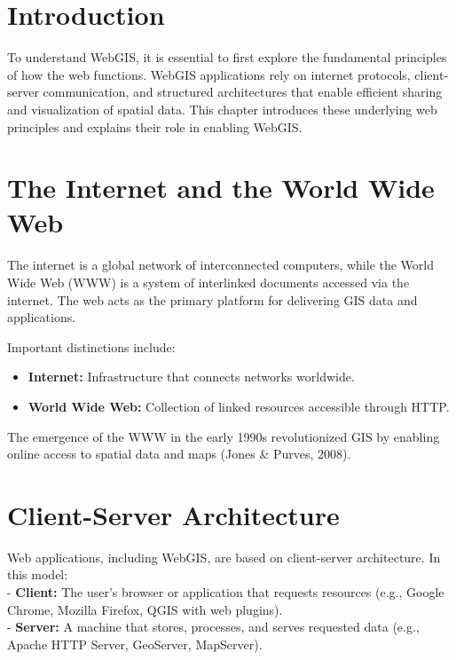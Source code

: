 \documentclass[
  11pt,
  letterpaper,
]{book}
\providecommand{\tightlist}{%
  \setlength{\itemsep}{0pt}\setlength{\parskip}{0pt}}
\begin{document}
\section{Introduction}\label{introduction-2}

To understand WebGIS, it is essential to first explore the fundamental
principles of how the web functions. WebGIS applications rely on
internet protocols, client-server communication, and structured
architectures that enable efficient sharing and visualization of spatial
data. This chapter introduces these underlying web principles and
explains their role in enabling WebGIS.

\section{The Internet and the World Wide
Web}\label{the-internet-and-the-world-wide-web}

The internet is a global network of interconnected computers, while the
World Wide Web (WWW) is a system of interlinked documents accessed via
the internet. The web acts as the primary platform for delivering GIS
data and applications.

Important distinctions include:

\begin{itemize}
\tightlist
\item
  \textbf{Internet:} Infrastructure that connects networks worldwide.\\
\item
  \textbf{World Wide Web:} Collection of linked resources accessible
  through HTTP.
\end{itemize}

The emergence of the WWW in the early 1990s revolutionized GIS by
enabling online access to spatial data and maps (Jones \& Purves, 2008).

\section{Client-Server Architecture}\label{client-server-architecture}

Web applications, including WebGIS, are based on client-server
architecture. In this model:\\
- \textbf{Client:} The user's browser or application that requests
resources (e.g., Google Chrome, Mozilla Firefox, QGIS with web
plugins).\\
- \textbf{Server:} A machine that stores, processes, and serves
requested data (e.g., Apache HTTP Server, GeoServer, MapServer).
\end{document}
